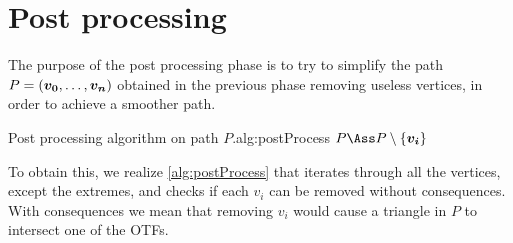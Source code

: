 \documentclass[dissertation.tex]{subfiles}
\begin{document}
\section{Post processing}\label{sec:postPro}
The purpose of the post processing phase is to try to simplify the
path $P=(\boldsymbol{v_0},\dots,\boldsymbol{v_n})$ obtained in the previous phase
removing useless vertices, in order
to achieve a smoother path.

\begin{algo}{Post processing algorithm on path $P$.}{alg:postProcess}
  \State $P\Ass P\setminus\{\ve{v_i}\}$
  \EndIf
  \EndIf
  \EndFor
  \EndProcedure
\end{algo}
To obtain this, we realize \cref{alg:postProcess} that
iterates through all the vertices, except the extremes, and checks if each
$v_i$ can be removed without consequences. With
consequences we mean that removing $v_i$ would cause a triangle
in $P$ to intersect one of the \acp{OTF}.
\end{document}
